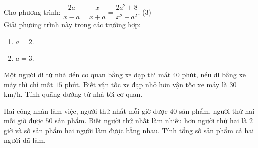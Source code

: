 \begin{bt}%
Cho phương trình: $\dfrac{2a}{x-a}-\dfrac{x}{x+a} = \dfrac{2a^2+8}{x^2-a^2}$.  (3) \\
Giải phương trình này trong các trường hợp: 
\begin{enumerate}
\item $a=2$. 
\item $a=3$. 
\end{enumerate} 
\end{bt}

\begin{bt}%
Một người đi từ nhà đến cơ quan bằng xe đạp thì mất $40$ phút, nếu đi bằng xe máy thì chỉ mất $15$ phút. Biết vận tốc xe đạp nhỏ hơn vận tốc xe máy là $30$ km/h. Tính quãng đường từ nhà tới cơ quan.
\end{bt}

\begin{bt}%
Hai công nhân làm việc, người thứ nhất mỗi giờ được $40$ sản phẩm, người thứ hai mỗi giờ được $50$ sản phẩm. Biết người thứ nhất làm nhiều hơn người thứ hai là $2$ giờ và số sản phẩm hai người làm được bằng nhau. Tính tổng số sản phẩm cả hai người đã làm.
\end{bt}
